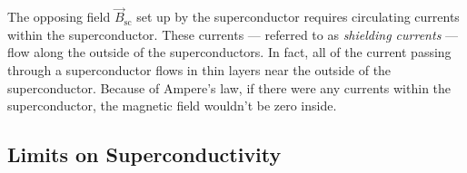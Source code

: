 The opposing field $\vec B_\text{sc}$ set up by the superconductor
requires circulating currents within the superconductor.  These
currents --- referred to as {\em shielding currents} --- flow along
the outside of the superconductors.  In fact, all of the current
passing through a superconductor flows in thin layers near the outside
of the superconductor.  Because of Ampere's law, if there were any
currents within the superconductor, the magnetic field wouldn't be
zero inside.


\subsection{Limits on Superconductivity}
%

%


